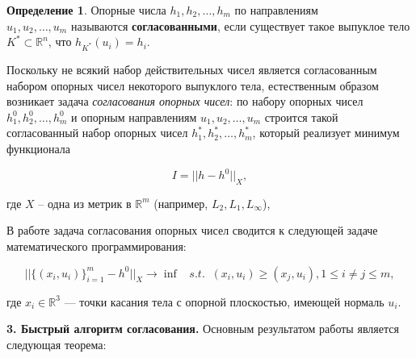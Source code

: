 \documentclass[a4paper, 10pt]{article}
\theoremstyle{definition}
\newtheorem{SmartDefinition}{Определение}
\theoremstyle{plain}
\theoremstyle{plain}
\begin{document}
\begin{SmartDefinition}
 \label{def:consistency}
 Опорные числа $h_{1}, h_{2}, \ldots, h_{m}$ по направлениям \\
 $u_{1}, u_{2}, \ldots, u_{m}$ называются \textbf{согласованными}, если
 существует такое выпуклое тело  $K^{*} \subset \mathbb{R}^{n}$, что
 $h_{K^{*}}(u_{i}) = h_{i}$.
\end{SmartDefinition}

Поскольку не всякий набор действительных чисел является
согласованным набором опорных чисел некоторого выпуклого тела, естественным
образом возникает задача \textit{согласования опорных чисел}: по набору опорных
чисел $h^{0}_{1}, h^{0}_{2}, \ldots, h^{0}_{m}$ и опорным направлениям
$u_{1}, u_{2}, \ldots, u_{m}$ строится такой согласованный набор опорных чисел
$h^{*}_{1}, h^{*}_{2}, \ldots, h^{*}_{m}$, который реализует минимум функционала

\begin{equation*}
 I = || h - h^{0} ||_{X},
\end{equation*}

где $X$ -- одна из метрик  в $\mathbb{R}^{m}$ (например,
$L_{2}, L_{1}, L_{\infty}$), 

В работе \cite{GardnerKiderlen} задача согласования опорных чисел сводится к
следующей задаче математического программирования:

\begin{equation}
\label{equation:gardner-kiderlen}
 ||\{(x_{i}, u_{i})\}_{i = 1}^{m} - h^{0}||_{X} \to \inf \;\;\; s. t. \;\;
 (x_{i}, u_{i}) \geq (x_{j}, u_{i}), 1 \leq i \neq j \leq m,
\end{equation}

где $x_{i} \in \mathbb{R}^{3}$ --- точки касания тела с опорной плоскостью,
имеющей нормаль $u_{i}$.


\textbf{3. Быстрый алгоритм согласования.}
Основным результатом работы \cite{palachev} является следующая теорема:
\end{document}
